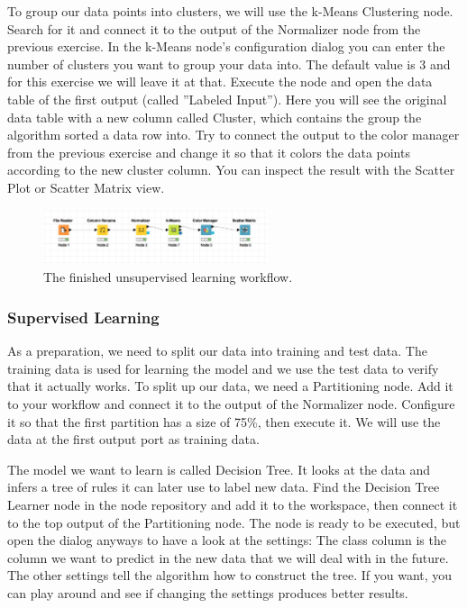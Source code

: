 To group our data points into clusters, we will use the k-Means Clustering node. Search for it and connect it to the output of the Normalizer node from the previous exercise. In the k-Means node's configuration dialog you can enter the number of clusters you want to group your data into. The default value is 3 and for this exercise we will leave it at that. Execute the node and open the data table of the first output (called ''Labeled Input''). Here you will see the original data table with a new column called Cluster, which contains the group the algorithm sorted a data row into. Try to connect the output to the color manager from the previous exercise and change it so that it colors the data points according to the new cluster column. You can inspect the result with the Scatter Plot or Scatter Matrix view.

\begin{figure}[h]
\centering
\includegraphics[width=0.59\textwidth]{graphics/knime_basics/clustering}
\caption{The finished unsupervised learning workflow.}
\label{fig:clustering}
\end{figure}

\subsubsection{Supervised Learning}

As a preparation, we need to split our data into training and test data. The training data is used for learning the model and we use the test data to verify that it actually works. To split up our data, we need a Partitioning node. Add it to your workflow and connect it to the output of the Normalizer node. Configure it so that the first partition has a size of 75\%, then execute it. We will use the data at the first output port as training data.

The model we want to learn is called Decision Tree. It looks at the data and infers a tree of rules it can later use to label new data. Find the Decision Tree Learner node in the node repository and add it to the workspace, then connect it to the top output of the Partitioning node. The node is ready to be executed, but open the dialog anyways to have a look at the settings: The class column is the column we want to predict in the new data that we will deal with in the future. The other settings tell the algorithm how to construct the tree. If you want, you can play around and see if changing the settings produces better results.

